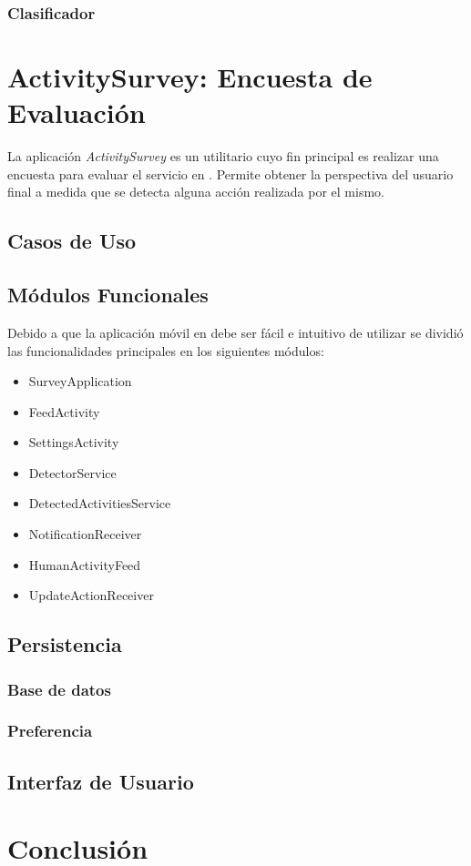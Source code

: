 \subsubsection{Clasificador}

\section{ActivitySurvey: Encuesta de Evaluación}

\label{sec55:activity}La aplicación \emph{ActivitySurvey} es un utilitario
cuyo fin principal es realizar una encuesta para evaluar el servicio
 en . Permite obtener la perspectiva del
usuario final a medida que se detecta alguna acción realizada por
el mismo. 

\subsection{Casos de Uso}

\subsection{Módulos Funcionales}

Debido a que la aplicación móvil en  debe ser fácil
e intuitivo de utilizar se dividió las funcionalidades principales
en los siguientes módulos:
\begin{itemize}
\item SurveyApplication
\item FeedActivity
\item SettingsActivity
\item DetectorService
\item DetectedActivitiesService
\item NotificationReceiver
\item HumanActivityFeed
\item UpdateActionReceiver
\end{itemize}

\subsection{Persistencia}

\subsubsection{Base de datos}

\subsubsection{Preferencia}

\subsection{Interfaz de Usuario}

\section{Conclusión}

\label{sec56:conclusion}
